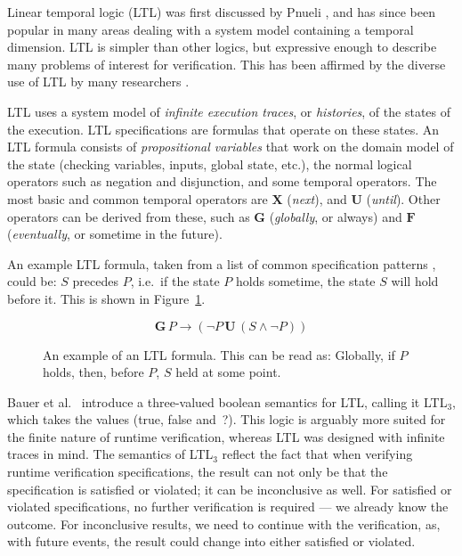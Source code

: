 Linear temporal logic (LTL) was first discussed by Pnueli \cite{pnueli77}, and
has since been popular in many areas dealing with a system model containing a
temporal dimension. LTL is simpler than other logics, but expressive enough to
describe many problems of interest for verification. This has been affirmed by
the diverse use of LTL by many researchers \cite{pnueli77}.

LTL uses a system model of \textit{infinite execution traces}, or
\textit{histories}, of the states of the execution. LTL specifications are
formulas that operate on these states. An LTL formula consists of
\textit{propositional variables} that work on the domain model of the state
(checking variables, inputs, global state, etc.), the normal logical operators
such as negation and disjunction, and some temporal operators. The most basic
and common temporal operators are $\boldsymbol{X}$ (\textit{next}), and
$\boldsymbol{U}$ (\textit{until}). Other operators can be derived from these,
such as $\boldsymbol{G}$ (\textit{globally}, or always) and $\boldsymbol{F}$
(\textit{eventually}, or sometime in the future).

An example LTL formula, taken from a list of common specification patterns
\cite{dwyer99patterns}, could be: $S$ precedes $P$, i.e.\ if the state $P$
holds sometime, the state $S$ will hold before it. This is shown in
Figure~\ref{figure-ltl}.

\begin{figure}[h!]
	\[
	\boldsymbol{G} \, P \rightarrow (\neg P \, \boldsymbol{U} \, (S \wedge \neg P))
	\]

	\caption{An example of an LTL formula. This can be read as: Globally, if $P$
	holds, then, before $P$, $S$ held at some point.}
	\label{figure-ltl}
\end{figure}

Bauer et al.\ \cite{bauer06monitoring} introduce a three-valued boolean
semantics for LTL, calling it LTL$_3$, which takes the values (true, false
and~?). This logic is arguably more suited for the finite nature of runtime
verification, whereas LTL was designed with infinite traces in mind. The
semantics of LTL$_3$ reflect the fact that when verifying runtime verification
specifications, the result can not only be that the specification is satisfied
or violated; it can be inconclusive as well. For satisfied or violated
specifications, no further verification is required --- we already know the
outcome. For inconclusive results, we need to continue with the verification,
as, with future events, the result could change into either satisfied or
violated.

